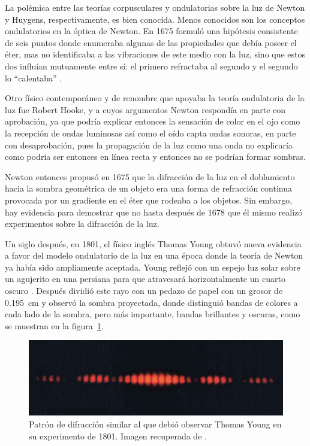 La polémica entre las teorías corpusculares y ondulatorias sobre la luz de Newton y Huygens, respectivamente, es bien conocida. Menos conocidos son los conceptos ondulatorios en la óptica de Newton.  En 1675 formuló una hipótesis consistente de seis puntos donde enumeraba algunas de las propiedades que debía poseer el éter, mas no identificaba a las vibraciones de este medio con la luz, sino que estos dos influían mutuamente entre sí: el primero refractaba al segundo y el segundo lo ``calentaba'' \parencite{stuewer-1970}.

Otro físico contemporáneo y de renombre que apoyaba la teoría ondulatoria de la luz fue Robert Hooke, y a cuyos argumentos Newton respondía en parte con aprobación, ya que podría explicar entonces la sensación de color en el ojo como la recepción de ondas luminosas así como el oído capta ondas sonoras, en parte con desaprobación, pues la propagación de la luz como una onda no explicaría como podría ser entonces en línea recta y entonces no se podrían formar sombras.

Newton entonces propusó en 1675 que la difracción de la luz en el doblamiento hacia la sombra geométrica de un objeto era una forma de refracción continua provocada por un gradiente en el éter que rodeaba a los objetos.  Sin embargo, hay evidencia para demostrar que no hasta después de 1678 que él mismo realizó experimentos sobre la difracción de la luz.

Un siglo después, en 1801, el físico inglés Thomas Young obtuvó nueva evidencia a favor del modelo ondulatorio de la luz en una época donde la teoría de Newton ya había sido ampliamente aceptada. Young reflejó con un espejo luz solar sobre un agujerito en una persiana para que atravesará horizontalmente un cuarto oscuro \parencite{young-1804}.  Después dividió este rayo con un pedazo de papel con un grosor de \qty{.195}{\cm} y observó la sombra proyectada, donde distinguió bandas de colores a cada lado de la sombra, pero más importante, bandas brillantes y oscuras, como se muestran en la figura~\ref{fig: double_slit}.

\begin{figure}[H]
	\centering
	\includegraphics[width=.9\linewidth]{Imagenes/diffraction}
	\caption{Patrón de difracción similar al que debió observar Thomas Young en su experimento de 1801. Imagen recuperada de \parencite{openstax}.}
	\label{fig: double_slit}
\end{figure}

